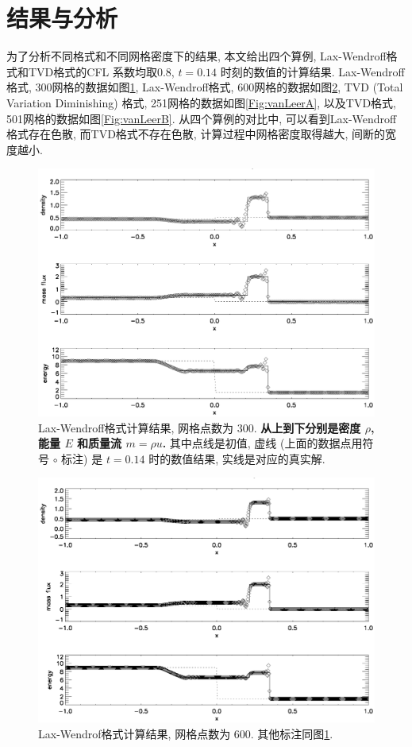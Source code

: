 \documentclass[10.5pt
]{article}
\begin{document}
\section{结果与分析}
为了分析不同格式和不同网格密度下的结果, 本文给出四个算例, Lax-Wendroff格式和TVD格式的CFL 系数均取0.8, $t=0.14$ 时刻的数值的计算结果. Lax-Wendroff格式, 300网格的数据如图\ref{Fig:LaxA}, Lax-Wendroff格式, 600网格的数据如图\ref{Fig:LaxB}, TVD (Total Variation Diminishing) 格式\citep{vanLeer1974,Harten1983}, 251网格的数据如图\ref{Fig:vanLeerA}, 以及TVD格式, 501网格的数据如图\ref{Fig:vanLeerB}. 从四个算例的对比中, 可以看到Lax-Wendroff格式存在色散, 而TVD格式不存在色散, 计算过程中网格密度取得越大, 间断的宽度越小.

\begin{figure}
\begin{center}
\includegraphics[width=.85\textwidth]{hw3_lax_300.eps}
\caption{Lax-Wendroff格式计算结果, 网格点数为 300. \textbf{从上到下分别是密度 $\rho$, 能量 $E$ 和质量流 $m = \rho u$.}
其中点线是初值, 虚线 (上面的数据点用符号 $\circ$ 标注) 是 $t=0.14$ 时的数值结果, 实线是对应的真实解.}\label{Fig:LaxA}
\end{center}
\end{figure}

\begin{figure}
\begin{center}
\includegraphics[width=.85\textwidth]{hw3_lax_600.eps}
\caption{Lax-Wendrof格式计算结果, 网格点数为 600. 
其他标注同图\ref{Fig:LaxA}.}\label{Fig:LaxB}
\end{center}
\end{figure}
\end{document}
